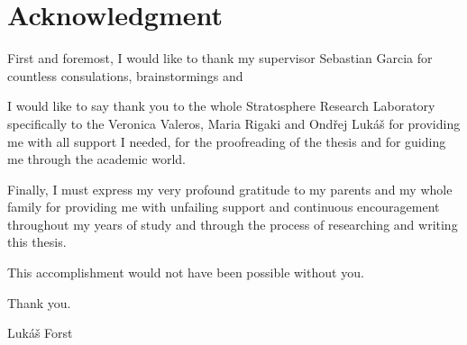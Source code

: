 \vspace*{\fill}

\section*{Acknowledgment}
First and foremost, I would like to thank my supervisor Sebastian Garcia for countless consulations, brainstormings and 


I would like to say thank you to the whole Stratosphere Research Laboratory specifically to the Veronica Valeros, Maria Rigaki and Ondřej Lukáš for providing me with all support I needed, for the proofreading of the thesis and for guiding me through the academic world.

\noindent
Finally, I must express my very profound gratitude to my parents and my whole family for providing me with unfailing support and continuous encouragement throughout my years of study and through the process of researching and writing this thesis. 

\bigskip \noindent
This accomplishment would not have been possible without you.
  
\bigskip \noindent
Thank you.
  
\bigskip \noindent
\hspace*{\fill} Lukáš Forst

\thispagestyle{empty}

\cleardoublepage